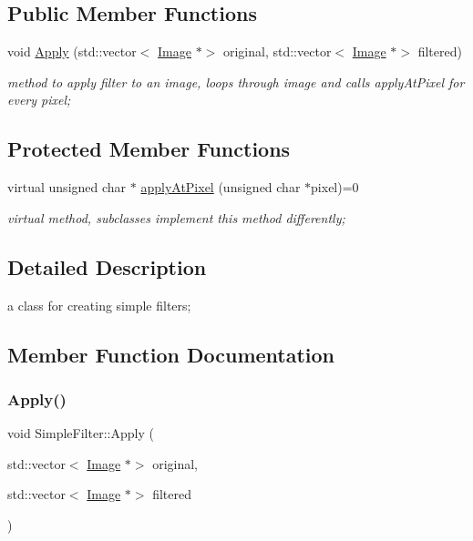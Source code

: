 \subsection*{Public Member Functions}
\begin{DoxyCompactItemize}
\item 
void \hyperlink{classSimpleFilter_a4400a0f97e26e84a33befd537fb4fea8}{Apply} (std\+::vector$<$ \hyperlink{classImage}{Image} $\ast$$>$ original, std\+::vector$<$ \hyperlink{classImage}{Image} $\ast$$>$ filtered)
\begin{DoxyCompactList}\small\item\em method to apply filter to an image, loops through image and calls apply\+At\+Pixel for every pixel; \end{DoxyCompactList}\end{DoxyCompactItemize}
\subsection*{Protected Member Functions}
\begin{DoxyCompactItemize}
\item 
virtual unsigned char $\ast$ \hyperlink{classSimpleFilter_a24100e6c29c4bf3bddf2763c22622d75}{apply\+At\+Pixel} (unsigned char $\ast$pixel)=0
\begin{DoxyCompactList}\small\item\em virtual method, subclasses implement this method differently; \end{DoxyCompactList}\end{DoxyCompactItemize}


\subsection{Detailed Description}
a class for creating simple filters; 

\subsection{Member Function Documentation}
\mbox{\label{classSimpleFilter_a4400a0f97e26e84a33befd537fb4fea8}} 
\subsubsection{\texorpdfstring{Apply()}{Apply()}}
{\footnotesize\ttfamily void Simple\+Filter\+::\+Apply (\begin{DoxyParamCaption}\item[{std\+::vector$<$ \hyperlink{classImage}{Image} $\ast$$>$}]{original,  }\item[{std\+::vector$<$ \hyperlink{classImage}{Image} $\ast$$>$}]{filtered }\end{DoxyParamCaption})\hspace{0.3cm}{\ttfamily [virtual]}}



